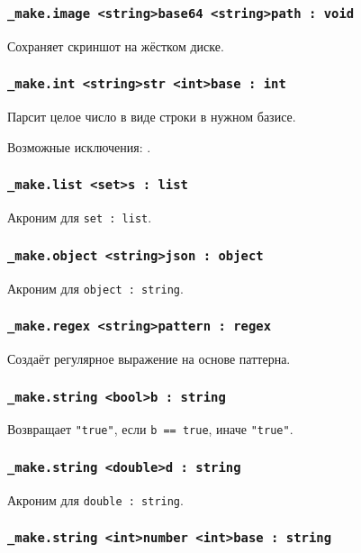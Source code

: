 \subsubsection{\lstinline|_make.image <string>base64 <string>path : void|}

Сохраняет скриншот на жёстком диске.

\subsubsection{\lstinline|_make.int <string>str <int>base : int|}

Парсит целое число в виде строки в нужном базисе.

Возможные исключения: .

\subsubsection{\lstinline|_make.list <set>s : list|}

Акроним для \lstinline|set : list|.

\subsubsection{\lstinline|_make.object <string>json : object|}

Акроним для \lstinline|object : string|.

\subsubsection{\lstinline|_make.regex <string>pattern : regex|}

Создаёт регулярное выражение на основе паттерна.

\subsubsection{\lstinline|_make.string <bool>b : string|}

Возвращает \lstinline|"true"|, если \lstinline|b == true|, иначе \lstinline|"true"|.

\subsubsection{\lstinline|_make.string <double>d : string|}

Акроним для \lstinline|double : string|.

\subsubsection{\lstinline|_make.string <int>number <int>base : string|}

